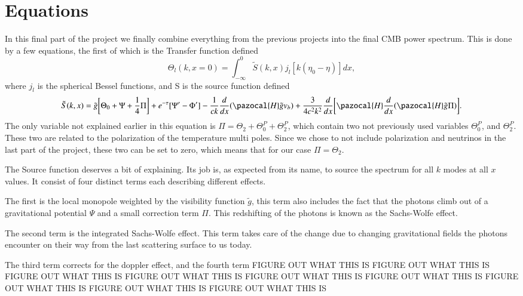 \documentclass[a4paper]{report}
\begin{document}
\section{Equations}\label{sec:Equations}
In this final part of the project we finally combine everything from the previous projects into the final CMB power spectrum. This is done by a few equations, the first of which is the Transfer function defined
\begin{equation}
 \Theta_l(k,x=0)=\int^0_{-\infty} \tilde{S}(k,x)j_l[k(\eta_0-\eta)]dx,
\end{equation}
where $j_l$ is the spherical Bessel functions, and S is the source function defined
\begin{equation}
 \tilde{S}(k,x) = \tilde{g}\bigg[\Theta_0+\Psi+\frac{1}{4}\Pi\bigg]+e^{-\tau}[\Psi^\prime-\Phi^\prime]-\frac{1}{ck}\frac{d}{dx}(\pazocal{H}\tilde{g}v_b) +\frac{3}{4c^2k^2}\frac{d}{dx}\bigg[\pazocal{H}\frac{d}{dx}(\pazocal
{H}\tilde{g}\Pi) \bigg].
\end{equation}
The only variable not explained earlier in this equation is $\Pi = \Theta_2 +\Theta_0^P+\Theta_2^P$, which contain two not previously used variables $\Theta_0^P$, and $\Theta_2^P$. These two are related to the polarization of the temperature multi poles. Since we chose to not include polarization and neutrinos in the last part of the project, these two can be set to zero, which means that for our case $\Pi = \Theta_2$.

The Source function deserves a bit of explaining. Its job is, as expected from its name, to source the spectrum for all $k$ modes at all $x$ values. It consist of four distinct terms each describing different effects. 

The first is the local monopole weighted by the visibility function $\tilde{g}$, this term also includes the fact that the photons climb out of a gravitational potential $\Psi$ and a small correction term $\Pi$. This redshifting of the photons is known as the Sachs-Wolfe effect. 

The second term is the integrated Sachs-Wolfe effect. This term takes care of the change due to changing gravitational fields the photons encounter on their way from the last scattering surface to us today.

The third term corrects for the doppler effect, and the fourth term FIGURE OUT WHAT THIS IS FIGURE OUT WHAT THIS IS FIGURE OUT WHAT THIS IS FIGURE OUT WHAT THIS IS FIGURE OUT WHAT THIS IS FIGURE OUT WHAT THIS IS FIGURE OUT WHAT THIS IS FIGURE OUT WHAT THIS IS FIGURE OUT WHAT THIS IS 
\end{document}
